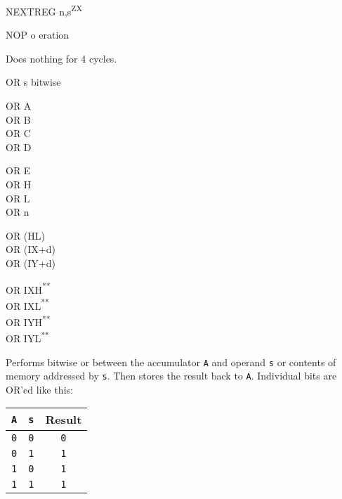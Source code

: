 \documentclass[12pt,twoside,openright,a4paper]{book}
\newcommand{\UNDOC}{\textnormal{\textsuperscript{**}}}
\newcommand{\ZXN}{\textnormal{\textsuperscript{ZX}}}
\begin{document}
\begin{basedescript}{
	\desclabelstyle{\multilinelabel}
	\desclabelwidth{3cm}}
\begin{DetailItem}{\small NEXTREG n,s{\scriptsize \ZXN}}
		\DetailNoEffect
				
		\begin{DetailTiming}
		\end{DetailTiming}

	\end{DetailItem}

	\begin{DetailItem}{NOP}
		{o eration}
		{}

		Does nothing for 4 cycles.
		
		\DetailNoEffect
						
		\begin{DetailTiming}
			\DetailTime{}{1}{4}
		\end{DetailTiming}

	\end{DetailItem}

	\begin{DetailItem}{OR s}
		{bitwise \IH{OR}}
		{\SymOR{s}}

		\begin{DetailVariants}[4]
			OR A\\
			OR B\\
			OR C\\
			OR D

			\columnbreak
			OR E\\
			OR H\\
			OR L\\
			OR n

			\columnbreak
			OR (HL)\\
			OR (IX+d)\\
			OR (IY+d)

			\columnbreak
			OR IXH\UNDOC\\
			OR IXL\UNDOC\\
			OR IYH\UNDOC\\
			OR IYL\UNDOC
		\end{DetailVariants}

		Performs bitwise or between the accumulator {\tt A} and operand {\tt s} or contents of memory addressed by {\tt s}. Then stores the result back to {\tt A}. Individual bits are OR'ed like this:

		\begin{tabular}{cc|c}
			{\tt A} & {\tt s} & Result \\
			\hline
			{\tt 0} & {\tt 0} & {\tt 0} \\
			{\tt 0} & {\tt 1} & {\tt 1} \\
			{\tt 1} & {\tt 0} & {\tt 1} \\
			{\tt 1} & {\tt 1} & {\tt 1} \\
		\end{tabular}


\end{DetailItem}
\end{basedescript}
\end{document}
